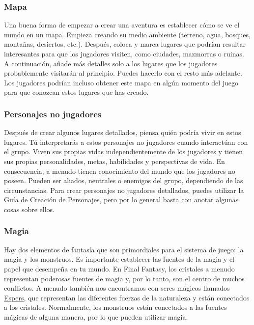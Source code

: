 \subsubsection*{Mapa}
Una buena forma de empezar a crear una aventura es establecer cómo se ve el mundo en un mapa. Empieza creando su medio ambiente (terreno, agua, bosques, montañas, desiertos, etc.). Después, coloca y marca lugares que podrían resultar interesantes para que los jugadores visiten, como ciudades, mazmorras o ruinas. A continuación, añade más detalles solo a los lugares que los jugadores probablemente visitarán al principio. Puedes hacerlo con el resto más adelante. Los jugadores podrían incluso obtener este mapa en algún momento del juego para que conozcan estos lugares que has creado.

\pagebreak

\subsubsection*{Personajes no jugadores}
Después de crear algunos lugares detallados, piensa quién podría vivir en estos lugares. Tú interpretarás a estos personajes no jugadores cuando interactúan con el grupo. Viven sus propias vidas independientemente de los jugadores y tienen sus propias personalidades, metas, habilidades y perspectivas de vida. En consecuencia, a menudo tienen conocimiento del mundo que los jugadores no poseen. Pueden ser aliados, neutrales o enemigos del grupo, dependiendo de las circunstancias. Para crear personajes no jugadores detallados, puedes utilizar la \hyperlink{char}{Guía de Creación de Personajes}, pero por lo general basta con anotar algunas cosas sobre ellos.

\subsubsection*{Magia}
Hay dos elementos de fantasía que son primordiales para el sistema de juego: la magia y los monstruos. Es importante establecer las fuentes de la magia y el papel que desempeña en tu mundo. En Final Fantasy, los cristales a menudo representan poderosas fuentes de magia y, por lo tanto, son el centro de muchos conflictos. A menudo también nos encontramos con seres mágicos llamados \hyperlink{summons}{Espers}, que representan las diferentes fuerzas de la naturaleza y están conectados a los cristales. Normalmente, los monstruos están conectados a las fuentes mágicas de alguna manera, por lo que pueden utilizar magia.

